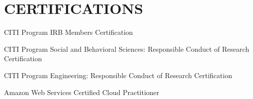 \documentclass{article}
\newcommand{\listitemspace}{0.25em}
\renewenvironment{itemize}
{\begin{list}{}{\setlength{\leftmargin}{0em}
                \setlength{\parskip}{0em}
                \setlength{\itemsep}{\listitemspace}
                \setlength{\parsep}{\listitemspace}}}
{\end{list}}
\begin{document}

\section*{\normalsize{CERTIFICATIONS}}
\begin{itemize}
    \item CITI Program IRB Members Certification
    \item CITI Program Social and Behavioral Sciences: Responsible Conduct of Research Certification
    \item CITI Program Engineering: Responsible Conduct of Research Certification
    \item Amazon Web Services Certified Cloud Practitioner
\end{itemize}
\end{document}
